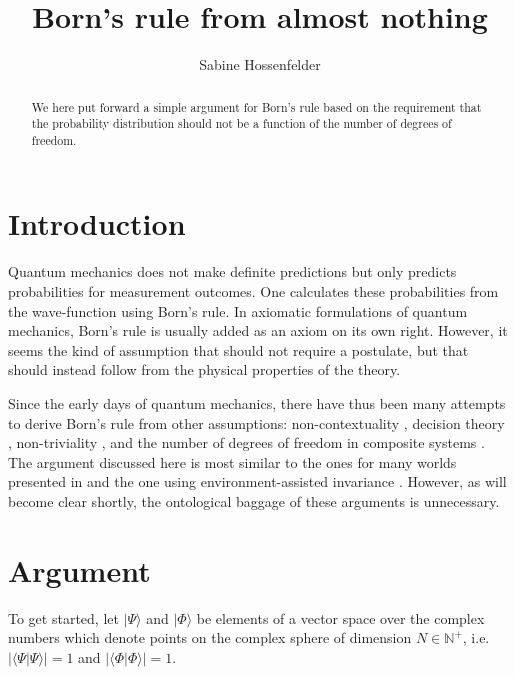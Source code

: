 \documentclass[11pt,twoside,A4]{article}
\begin{document}
\title{Born's rule from almost nothing}
\author{Sabine Hossenfelder}
\date{}
\maketitle
\vspace*{-1cm}

\begin{abstract}
We here put forward a simple argument for Born's rule based on the requirement that the probability distribution should not be a function of the number of degrees of freedom.
\end{abstract} 

\section{Introduction}

Quantum mechanics does not make definite predictions but only predicts probabilities for measurement outcomes. One calculates these probabilities
from the wave-function using Born's rule. In axiomatic formulations of quantum mechanics, Born's rule is usually added as an
axiom on its own right. However, it seems the kind of assumption that should not require a postulate, but that should instead follow from
the physical properties of the theory. 

Since the early days of quantum mechanics, there have thus been many attempts to derive 
Born's rule from other assumptions: non-contextuality \cite{Gleason}, decision theory \cite{Deutsch}, non-triviality \cite{Aaronson}, and the number of degrees of freedom in composite systems \cite{Hardy,Masanes:2010tt,Brukner}. The argument discussed here is most similar to the ones for many worlds presented in \cite{Vaidman, Carroll:2014mea} and the one using environment-assisted invariance \cite{Zurek}. However, as will become clear shortly, the ontological baggage of these arguments is unnecessary. 

\section{Argument}

To get started, let $|\Psi \rangle$ and $|\Phi \rangle$ be elements of a vector space over the complex numbers which denote points on the complex sphere of dimension $N \in {\mathbb{N}}^+$, i.e. $|\langle \Psi | \Psi \rangle| =1$ and $|\langle \Phi | \Phi \rangle| =1$.
\bigskip
\end{document}

